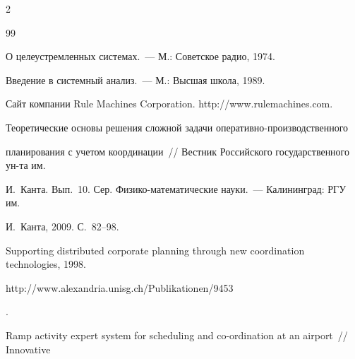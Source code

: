 \begin{multicols}{2}
{{\begin{thebibliography}{99}




О целеустремленных системах.~--- М.: Советское радио, 1974.









Введение в системный анализ.~--- М.: Высшая школа, 1989.







Сайт компании Rule Machines Corporation. {\sf http://\linebreak www.rulemachines.com}.









Теоретические основы решения сложной задачи оперативно-про\-из\-вод\-ст\-вен\-но\-го 


планирования с учетом координации~// Вестник Российского государственного ун-та им.\ 


И.~Канта. Вып.~10. Сер. Физико-математические науки.~--- Калининград: РГУ им. 


И.~Канта, 2009. С.~82--98.









Supporting distributed corporate planning through new coordination technologies, 1998. {\sf 


http://\linebreak www.alexandria.unisg.ch/Publikationen/9453}.











 \label{end\stat}


 






Ramp activity expert system for scheduling and co-ordination at an airport~// Innovative 



\end{thebibliography}}}
\end{multicols}
